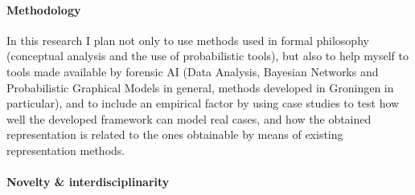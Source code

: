 \documentclass[11pt, a4paper]{article}
\begin{document}


\vspace{-8mm}

\paragraph{Methodology}  

In this research I plan not only to use  methods used in formal philosophy (conceptual analysis and the  use of probabilistic tools), but also to help myself to tools made available by forensic AI (Data Analysis, Bayesian Networks and Probabilistic Graphical Models in general, methods developed in Groningen in particular), and to include an empirical factor by using case studies to  test how well the developed framework can  model real cases, and how the obtained representation is related to the ones obtainable by means of existing representation methods. 




\vspace{-6mm}

\paragraph{Novelty \& interdisciplinarity} 
\end{document}
